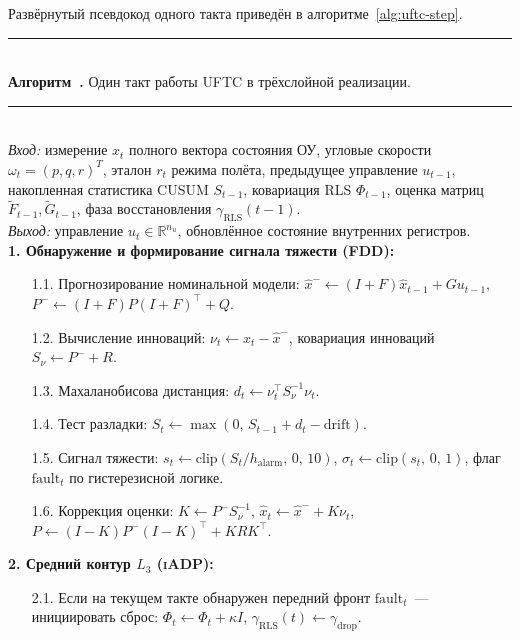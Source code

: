 \documentclass[a4paper,14pt]{extarticle}
\newcounter{algorithm}
\newcommand{\UFTC}{\textsc{UFTC}}
\newcommand{\IADP}{\textsc{iADP}}
\newcommand{\FDD}{\textsc{FDD}}
\newcommand{\CUSUM}{\textsc{CUSUM}}
\newcommand{\RLS}{\textsc{RLS}}
\begin{document}
Развёрнутый псевдокод одного такта приведён в алгоритме~\ref{alg:uftc-step}.

\begin{center}
\begin{minipage}{0.96\linewidth}
\label{alg:uftc-step}
\rule{\linewidth}{0.6pt}\\[2pt]
\textbf{Алгоритм~\thealgorithm.} Один такт работы \UFTC{} в трёхслойной реализации.\\[2pt]
\rule{\linewidth}{0.4pt}\\[3pt]
\textit{Вход:} измерение $x_t$ полного вектора состояния ОУ, угловые скорости $\omega_t = (p,q,r)^T$, эталон $r_t$ режима полёта, предыдущее управление $u_{t-1}$, накопленная статистика \CUSUM{} $S_{t-1}$, ковариация \RLS{} $\Phi_{t-1}$, оценка матриц $\tilde F_{t-1}, \tilde G_{t-1}$, фаза восстановления $\gamma_\text{RLS}(t-1)$.\\
\textit{Выход:} управление $u_t \in \mathbb{R}^{n_u}$, обновлённое состояние внутренних регистров.\\[5pt]
\textbf{1. Обнаружение и формирование сигнала тяжести (\FDD{}):}
\begin{enumerate}
\item[1.1.] Прогнозирование номинальной модели:
$\hat x^- \leftarrow (I+F)\hat x_{t-1} + Gu_{t-1}$, $P^- \leftarrow (I+F)P(I+F)^\top + Q$.
\item[1.2.] Вычисление инноваций: $\nu_t \leftarrow x_t - \hat x^-$, ковариация инноваций $S_\nu \leftarrow P^- + R$.
\item[1.3.] Махаланобисова дистанция: $d_t \leftarrow \nu_t^\top S_\nu^{-1} \nu_t$.
\item[1.4.] Тест разладки: $S_t \leftarrow \max(0,\, S_{t-1} + d_t - \mathrm{drift})$.
\item[1.5.] Сигнал тяжести: $s_t \leftarrow \mathrm{clip}(S_t/h_\text{alarm},\,0,\,10)$, $\sigma_t \leftarrow \mathrm{clip}(s_t,\,0,\,1)$, флаг $\text{fault}_t$ по гистерезисной логике.
\item[1.6.] Коррекция оценки: $K \leftarrow P^- S_\nu^{-1}$, $\hat x_t \leftarrow \hat x^- + K\nu_t$, $P \leftarrow (I-K)P^-(I-K)^\top + KRK^\top$.
\end{enumerate}
\textbf{2. Средний контур $L_3$ (\IADP{}):}
\begin{enumerate}
\item[2.1.] Если на текущем такте обнаружен передний фронт $\text{fault}_t$~--- инициировать сброс: $\Phi_t \leftarrow \Phi_t + \kappa I$, $\gamma_\text{RLS}(t) \leftarrow \gamma_\text{drop}$.

\end{enumerate}
\end{minipage}
\end{center}
\end{document}
